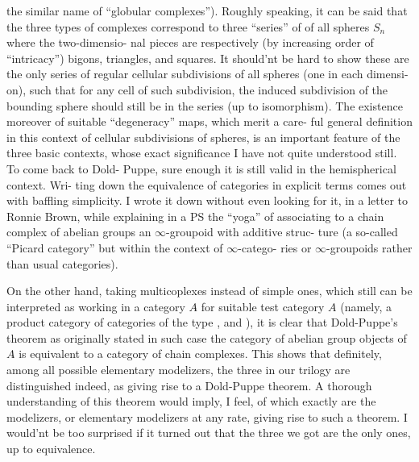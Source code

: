 the similar name of ``globular complexes''). Roughly speaking, it can be
said that the three types of complexes correspond to three ``series'' of
\hand{\uline{\textcolor{black}{regular}}} \hand{\uline{\textcolor{black}{cellular}}}  of all spheres $S_n$  where the two-dimensio-%
nal pieces are respectively (by increasing order of ``intricacy'') bigons,
triangles, and squares. It should'nt be hard to show these are the only
series of regular cellular subdivisions of all spheres (one in each dimensi-%
on), such that for any cell of such subdivision, the induced subdivision
of the bounding sphere should still be in the series (up to isomorphism).
The existence moreover of suitable ``degeneracy'' maps, which merit a care-%
ful general definition in this context of cellular subdivisions of spheres,
is an important   feature of the three basic contexts, whose exact
significance I have not quite understood still.  To come back to Dold-%
Puppe, sure enough it is still valid in the hemispherical context. Wri-%
ting down the equivalence of categories in explicit terms comes out with
baffling simplicity. I wrote it down without even looking for it, in a
letter to Ronnie Brown, while explaining in a PS the ``yoga'' of associating
to a chain complex of abelian groups an $\infty$-groupoid with additive struc-%
ture (a so-called ``Picard category'' but within the context of $\infty$-catego-%
ries or $\infty$-groupoids\hand{,} rather than usual categories).

On the other hand, taking multicoplexes instead of simple ones, 
which still can be interpreted as working in a category $A\hat{}$ for suitable
test category $A$ (namely, a product category of categories of the type
\hand{$\Box$}, \hand{$\triangle$} and \hand{$\Diamond$}), it is clear that Dold-Puppe's theorem 
as originally stated  in such case the category of abelian group objects
of $A\hat{}$ is equivalent to a category of \hand{\uline{\textcolor{black}{multiple}}} chain complexes. This shows
that definitely, among all possible elementary modelizers, the three in
our trilogy are distinguished indeed, as giving rise to a Dold-Puppe
theorem. A thorough understanding of this theorem would imply, I feel,
 of which exactly are the modelizers, or elementary modelizers at any rate,
giving rise to such a theorem. I would'nt be too surprised if it turned
out that the three we got are the only ones, up to equivalence.

